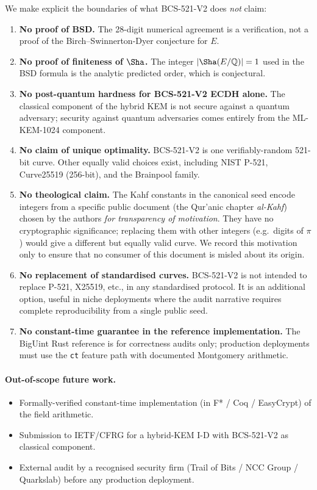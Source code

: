 \documentclass[11pt,a4paper]{article}
\theoremstyle{plain}
\theoremstyle{definition}
\newcommand{\Q}{\mathbb{Q}}
\newcommand{\BCSV}{\textsf{BCS\hbox{-}521\hbox{-}V2}}
\newcommand{\MLKEM}{\textsf{ML\hbox{-}KEM\hbox{-}1024}}
\begin{document}
We make explicit the boundaries of what \BCSV{} does \emph{not} claim:

\begin{enumerate}
  \item \textbf{No proof of BSD.} The 28-digit numerical agreement is
    a verification, not a proof of the Birch--Swinnerton-Dyer
    conjecture for $E$.
  \item \textbf{No proof of finiteness of $\Sha$.} The integer
    $|\Sha(E/\Q)| = 1$ used in the BSD formula is the analytic
    predicted order, which is conjectural.
  \item \textbf{No post-quantum hardness for \BCSV{} ECDH alone.}
    The classical component of the hybrid KEM is not secure against
    a quantum adversary; security against quantum adversaries comes
    entirely from the \MLKEM{} component.
  \item \textbf{No claim of unique optimality.} \BCSV{} is one
    verifiably-random 521-bit curve. Other equally valid choices
    exist, including NIST P-521, Curve25519 (256-bit), and the
    Brainpool family.
  \item \textbf{No theological claim.} The Kahf constants in the
    canonical seed encode integers from a specific public document
    (the Qur'anic chapter \emph{al-Kahf}) chosen by the authors
    \emph{for transparency of motivation}. They have no cryptographic
    significance; replacing them with other integers (e.g.\ digits
    of $\pi$) would give a different but equally valid curve. We
    record this motivation only to ensure that no consumer of this
    document is misled about its origin.
  \item \textbf{No replacement of standardised curves.} \BCSV{} is
    not intended to replace P-521, X25519, etc., in any
    standardised protocol. It is an additional option, useful in
    niche deployments where the audit narrative requires complete
    reproducibility from a single public seed.
  \item \textbf{No constant-time guarantee in the reference
    implementation.} The BigUint Rust reference is for correctness
    audits only; production deployments must use the \texttt{ct}
    feature path with documented Montgomery arithmetic.
\end{enumerate}

\paragraph{Out-of-scope future work.}
\begin{itemize}
\item Formally-verified constant-time implementation (in F* / Coq /
  EasyCrypt) of the field arithmetic.
\item Submission to IETF/CFRG for a hybrid-KEM I-D with \BCSV{} as
  classical component.
\item External audit by a recognised security firm
  (Trail of Bits / NCC Group / Quarkslab) before any production
  deployment.
\end{itemize}
\end{document}
